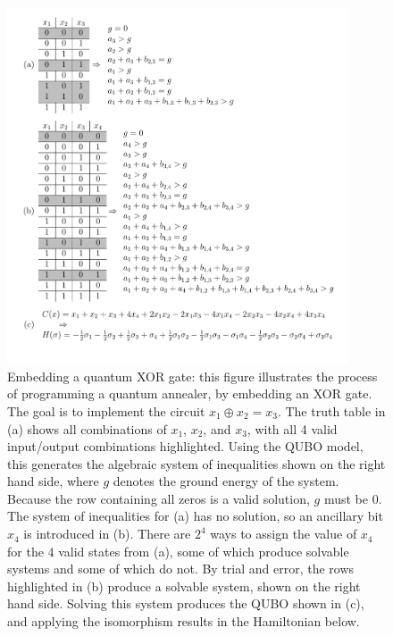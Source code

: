 \begin{figure}
\centering
\includegraphics[width=0.9\textwidth]{fig2.pdf}
\caption{Embedding a quantum XOR gate: this figure illustrates the process of programming a quantum annealer, by embedding an XOR gate. The goal is to implement the circuit $x_1 \oplus x_2 = x_3$.
The truth table in (a) shows all combinations of $x_1$, $x_2$, and $x_3$, with all 4 valid input/output combinations highlighted.
Using the QUBO model, this generates the algebraic system of inequalities shown on the right hand side, where $g$ denotes the ground energy of the system.
Because the row containing all zeros is a valid solution, $g$ must be $0$.
The system of inequalities for (a) has no solution, so an ancillary bit $x_4$ is introduced in (b).
There are $2^4$ ways to assign the value of $x_4$ for the $4$ valid states from (a), some of which produce solvable systems and some of which do not.
By trial and error, the rows highlighted in (b) produce a solvable system, shown on the right hand side.
Solving this system produces the QUBO shown in (c), and applying the isomorphism results in the Hamiltonian below.
}
\label{fig:xor-ex}
\end{figure}